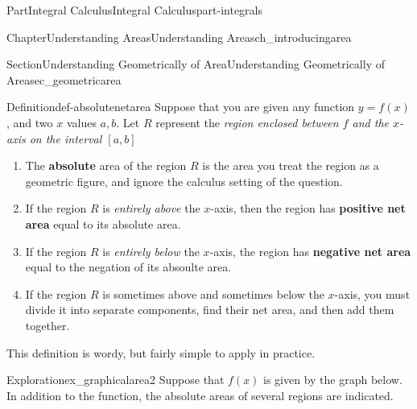 \documentclass[oneside,10pt,]{tufte-book}
\newcommand{\terminology}[1]{\textbf{#1}}
\numberwithin{equation}{chapter}
\begin{document}
\begin{partptx}{Part}{Integral Calculus}{}{Integral Calculus}{}{}{part-integrals}
\begin{chapterptx}{Chapter}{Understanding Areas}{}{Understanding Areas}{}{}{ch_introducingarea}
\begin{sectionptx}{Section}{Understanding Geometrically of Area}{}{Understanding Geometrically of Area}{}{}{sec_geometricarea}
\begin{definition}{Definition}{}{def-absolutenetarea}%
Suppose that you are given any function \(y=f(x)\), and two \(x\) values \(a,b\). Let \(R\) represent the \emph{region enclosed between \(f\) and the \(x\)-axis on the interval \([a,b]\)}%
\begin{enumerate}
\item{}The \terminology{absolute} area of the region \(R\) is the area you treat the region as a geometric figure, and ignore the calculus setting of the question.%
\item{}If the region \(R\) is \emph{entirely above} the \(x\)-axis, then the region has \terminology{positive net area} equal to its absolute area.%
\item{}If the region \(R\) is \emph{entirely below} the \(x\)-axis, the region has \terminology{negative net area} equal to the negation of its absoulte area.%
\item{}If the region \(R\) is sometimes above and sometimes below the \(x\)-axis, you must divide it into separate components, find their net area, and then add them together.%
\end{enumerate}
%
\end{definition}
This definition is wordy, but fairly simple to apply in practice.%
\begin{exploration}{Exploration}{}{ex_graphicalarea2}%
Suppose that \(f(x)\) is given by the graph below. In addition to the function, the absolute areas of several regions are indicated.%
\begin{image}{0.25}{0.5}{0.25}{}%
\end{image}
\end{exploration}
\end{sectionptx}
\end{chapterptx}
\end{partptx}
\end{document}
